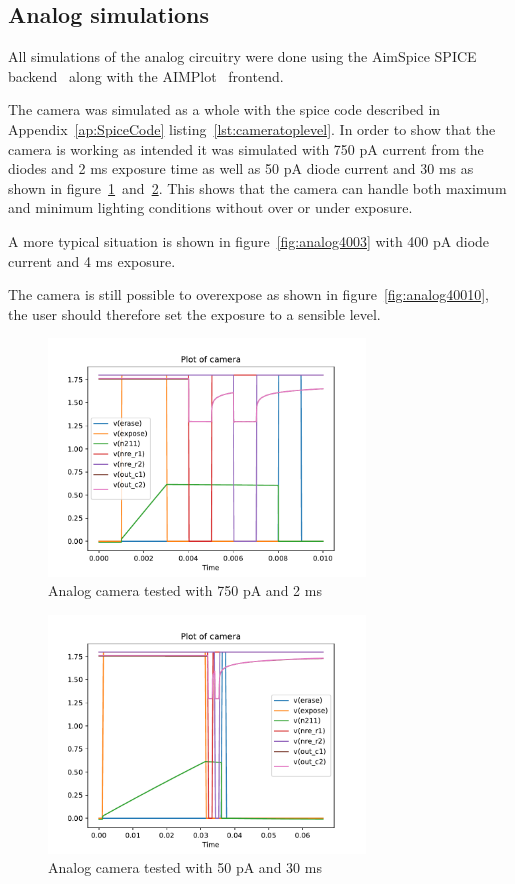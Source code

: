 \subsection{Analog simulations}

All simulations of the analog circuitry were done using the AimSpice SPICE backend~\cite{AIMSpice} along with the AIMPlot~\cite{aimplot} frontend.

The camera was simulated as a whole with the spice code described in Appendix~\ref{ap:SpiceCode} listing~\ref{lst:cameratoplevel}.
In order to show that the camera is working as intended it was simulated with 750 pA current from the diodes and 2 ms exposure time as well as 50 pA diode current and 30 ms as shown in figure~\ref{fig:analog7502}~and~\ref{fig:analog5030}.
This shows that the camera can handle both maximum and minimum lighting conditions without over or under exposure.

A more typical situation is shown in figure~\ref{fig:analog4003} with 400 pA diode current and 4 ms exposure.

The camera is still possible to overexpose as shown in figure~\ref{fig:analog40010}, the user should therefore set the exposure to a sensible level.

\begin{figure}[htbp]
  \centering
  \includegraphics[width=0.75\textwidth]{../analog/camera7502}
  \caption{Analog camera tested with 750 pA and 2 ms}
  \label{fig:analog7502}
\end{figure}

\begin{figure}[htbp]
  \centering
  \includegraphics[width=0.75\textwidth]{../analog/camera5030}
  \caption{Analog camera tested with 50 pA and 30 ms}
  \label{fig:analog5030}
\end{figure}

